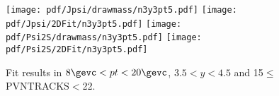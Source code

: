 \begin{figure}[H]
\begin{center}
\texttt{[image: pdf/Jpsi/drawmass/n3y3pt5.pdf]}
\texttt{[image: pdf/Jpsi/2DFit/n3y3pt5.pdf]}
\vspace*{-0.5cm}
\texttt{[image: pdf/Psi2S/drawmass/n3y3pt5.pdf]}
\texttt{[image: pdf/Psi2S/2DFit/n3y3pt5.pdf]}
\vspace*{-0.5cm}
\end{center}
\caption{Fit results in $8\gevc<pt<20\gevc$, $3.5<y<4.5$ and 15$\leq$PVNTRACKS$<$22.}
\label{Fitn3y3pt5}
\end{figure}
